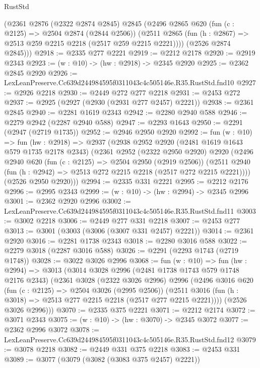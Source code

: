 \begin{lexlean}{RustStd}
\begin{coremodule}
      (@2361
        @2876
        (@2322 @2874 @2845)
        @2845
        (@2496
          @2865
          @620
          (fun (c : @2125) => @2504 @2874 (@2844 @2506))
          (@2511 @2865 (fun (h : @2867) => @2513 @259 @2215 @2218 (@2517 @259 @2215 @2221))))
        (@2526 @2874 @2845)))
@2918 := @2335 @277 @2221
@2919 := @2212 @2178
@2920 := @2919 @2343
@2923 := (w : @10) -> (hw : @2918) -> @2345 @2920
@2925 := @2362 @2845 @2920
@2926 := LexLeanPreserve.Cc639d244984595f0311043c4c505146e.R35.RustStd.fnd10
@2927 := @2926 @2218
@2930 := @2449 @272 @277 @2218
@2931 := @2453 @272
@2937 := @2925 (@2927 (@2930 (@2931 @277 @2457) @2221))
@2938 := @2361 @2845
@2940 := @2281 @1619 @2343
@2942 := @2280 @2940 @588
@2946 := @2279 @2942 (@2287 @2940 @588)
@2947 := @2293 @1643
@2950 := @2291 (@2947 (@2719 @1735))
@2952 := @2946 @2950 @2920
@2992 := fun (w : @10) =>
  fun (hw : @2918) =>
  @2937
    (@2938
      @2952
      @2920
      (@2481 @1619 @1643 @579 @1735 @2178 @2343)
      (@2361
        @2952
        (@2322 @2950 @2920)
        @2920
        (@2496
          @2940
          @620
          (fun (c : @2125) => @2504 @2950 (@2919 @2506))
          (@2511 @2940 (fun (h : @2942) => @2513 @272 @2215 @2218 (@2517 @272 @2215 @2221))))
        (@2526 @2950 @2920)))
@2994 := @2335 @331 @2221
@2995 := @2212 @2176
@2996 := @2995 @2343
@2999 := (w : @10) -> (hw : @2994) -> @2345 @2996
@3001 := @2362 @2920 @2996
@3002 := LexLeanPreserve.Cc639d244984595f0311043c4c505146e.R35.RustStd.fnd11
@3003 := @3002 @2218
@3006 := @2449 @277 @331 @2218
@3007 := @2453 @277
@3013 := @3001 (@3003 (@3006 (@3007 @331 @2457) @2221))
@3014 := @2361 @2920
@3016 := @2281 @1738 @2343
@3018 := @2280 @3016 @588
@3022 := @2279 @3018 (@2287 @3016 @588)
@3026 := @2291 (@2293 @1743 (@2719 @1748))
@3028 := @3022 @3026 @2996
@3068 := fun (w : @10) =>
  fun (hw : @2994) =>
  @3013
    (@3014
      @3028
      @2996
      (@2481 @1738 @1743 @579 @1748 @2176 @2343)
      (@2361
        @3028
        (@2322 @3026 @2996)
        @2996
        (@2496
          @3016
          @620
          (fun (c : @2125) => @2504 @3026 (@2995 @2506))
          (@2511 @3016 (fun (h : @3018) => @2513 @277 @2215 @2218 (@2517 @277 @2215 @2221))))
        (@2526 @3026 @2996)))
@3070 := @2335 @375 @2221
@3071 := @2212 @2174
@3072 := @3071 @2343
@3075 := (w : @10) -> (hw : @3070) -> @2345 @3072
@3077 := @2362 @2996 @3072
@3078 := LexLeanPreserve.Cc639d244984595f0311043c4c505146e.R35.RustStd.fnd12
@3079 := @3078 @2218
@3082 := @2449 @331 @375 @2218
@3083 := @2453 @331
@3089 := @3077 (@3079 (@3082 (@3083 @375 @2457) @2221))

\end{coremodule}
\end{lexlean}
